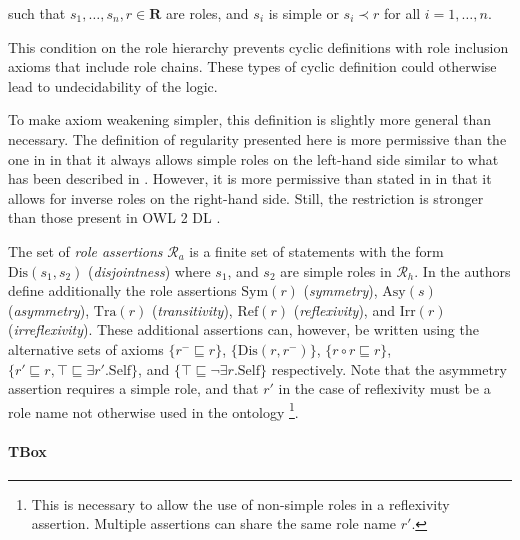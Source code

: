 such that $s_1, \dots, s_n, r \in \mathbf{R}$ are roles, and $s_i$ is simple or $s_i \prec r$ for all $i = 1, \dots, n$.

This condition on the role hierarchy prevents cyclic definitions with role inclusion axioms that include role chains. These types of cyclic definition could otherwise lead to undecidability of the logic.

\begin{example}
\end{example}

\begin{example}
\end{example}

To make axiom weakening simpler, this definition is slightly more general than necessary. The definition of regularity presented here is more permissive than the one in \cite{horrocks2006even} in that it always allows simple roles on the left-hand side similar to what has been described in \cite{rudolph2011foundations}. However, it is more permissive than stated in \cite{rudolph2011foundations} in that it allows for inverse roles on the right-hand side. Still, the restriction is stronger than those present in OWL 2 DL \cite{motik2009owl_spec}.

The set of \emph{role assertions} $\mathcal{R}_a$ is a finite set of statements with the form $\mathrm{Dis}(s_1, s_2)$ (\emph{disjointness}) where $s_1$, and $s_2$ are simple roles in $\mathcal{R}_h$. In \cite{horrocks2006even} the authors define additionally the role assertions $\mathrm{Sym}(r)$ (\emph{symmetry}), $\mathrm{Asy}(s)$ (\emph{asymmetry}), $\mathrm{Tra}(r)$ (\emph{transitivity}), $\mathrm{Ref}(r)$ (\emph{reflexivity}), and $\mathrm{Irr}(r)$ (\emph{irreflexivity}). These additional assertions can, however, be written using the alternative sets of axioms $\{ r^- \sqsubseteq r \}$, $\{ \mathrm{Dis}(r, r^-) \}$, $\{ r \circ r \sqsubseteq r \}$, $\{ r' \sqsubseteq r , \top \sqsubseteq \exists r'. \mathrm{Self} \}$, and $\{ \top \sqsubseteq \lnot \exists r . \mathrm{Self} \}$ respectively. Note that the asymmetry assertion requires a simple role, and that $r'$ in the case of reflexivity must be a role name not otherwise used in the ontology \footnote{This is necessary to allow the use of non-simple roles in a reflexivity assertion. Multiple assertions can share the same role name $r'$.}.

\paragraph{TBox} \label{tbox}

